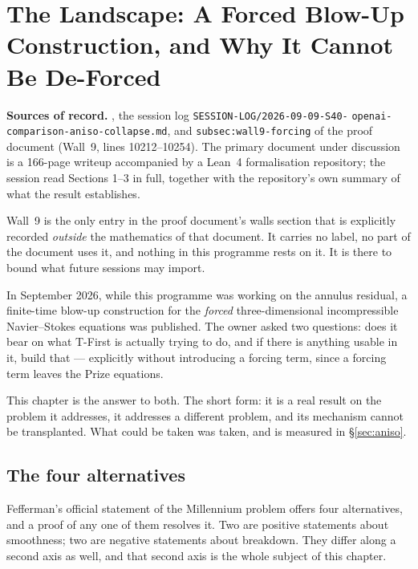 \chapter{The Landscape: A Forced Blow-Up Construction, and Why It Cannot Be
De-Forced}
\label{ch:openai}

\begin{record}
\textbf{Sources of record.} , the session log
\texttt{SESSION-LOG/}\allowbreak\texttt{2026-09-09-S40-}\allowbreak
\texttt{openai-comparison-}\allowbreak\texttt{aniso-collapse.md}, and
\texttt{subsec:wall9-forcing} of the proof document (Wall~9, lines
10212--10254). The primary document under discussion is a 166-page writeup
accompanied by a Lean~4 formalisation repository; the session read Sections
1--3 in full, together with the repository's own summary of what the result
establishes.

\smallskip
Wall~9 is the only entry in the proof document's walls section that is
explicitly recorded \emph{outside} the mathematics of that document. It
carries no label, no part of the document uses it, and nothing in this
programme rests on it. It is there to bound what future sessions may import.
\end{record}

In September 2026, while this programme was working on the annulus residual, a
finite-time blow-up construction for the \emph{forced} three-dimensional
incompressible Navier--Stokes equations was published. The owner asked two
questions: does it bear on what T-First is actually trying to do, and if there
is anything usable in it, build that --- explicitly without introducing a
forcing term, since a forcing term leaves the Prize equations.

This chapter is the answer to both. The short form: it is a real result on the
problem it addresses, it addresses a different problem, and its mechanism
cannot be transplanted. What could be taken was taken, and is measured in
\S\ref{sec:aniso}.

\section{The four alternatives}
\label{sec:four-alternatives}

Fefferman's official statement of the Millennium problem offers four
alternatives, and a proof of any one of them resolves it. Two are positive
statements about smoothness; two are negative statements about breakdown. They
differ along a second axis as well, and that second axis is the whole subject
of this chapter.

